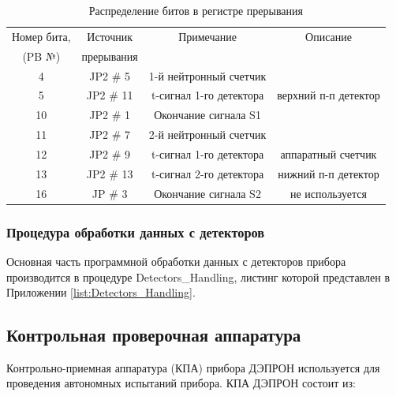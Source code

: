 \begin{table} 
	\begin{tabular}{|c|c|c|c|}
		\hline
		Номер бита, &  Источник  &       Примечание        &       Описание       \\
		  (PB №)    & прерывания &                         &  \\ \hline
		     4      &  JP2 \# 5  & 1-й нейтронный счетчик  &  \\ \hline
		     5      & JP2 \# 11  & t-сигнал 1-го детектора & верхний п-п детектор \\ \hline
		    10      &  JP2 \# 1  &  Окончание сигнала S1   &  \\ \hline
		    11      &  JP2 \# 7  & 2-й нейтронный счетчик  &  \\ \hline
		    12      &  JP2 \# 9  & t-сигнал 1-го детектора &  аппаратный счетчик  \\ \hline
		    13      & JP2 \# 13  & t-сигнал 2-го детектора & нижний п-п детектор  \\ \hline
		    16      &  JP \# 3   &  Окончание сигнала S2   &   не используется    \\ \hline
	\end{tabular} 
	\caption{Распределение битов в регистре прерывания}
	\label{tab:int}
\end{table}




\subsubsection{Процедура обработки данных с детекторов}

Основная часть программной обработки данных с детекторов прибора производится в процедуре Detectors\_Handling, листинг которой представлен в Приложении \ref{list:Detectors_Handling}.




\subsection{Контрольная проверочная аппаратура}

Контрольно-приемная аппаратура (КПА) прибора ДЭПРОН используется для  проведения автономных испытаний прибора. КПА ДЭПРОН состоит из:


